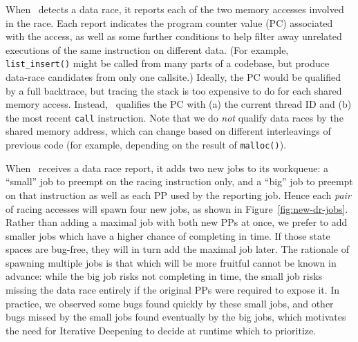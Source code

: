 When \landslide~detects a data race, it reports each of the two memory accesses involved in the race.
Each report indicates the program counter value (PC) associated with the access, as well as some further conditions to help filter away unrelated executions of the same instruction on different data.
(For example, {\tt list\_insert()} might be called from many parts of a codebase, but produce data-race candidates from only one callsite.)
Ideally, the PC would be qualified by a full backtrace, but tracing the stack is too expensive to do for each shared memory access.
Instead, \landslide~qualifies the PC with
(a) the current thread ID and
(b) the most recent {\tt call} instruction.
Note that we do {\em not} qualify data races by the shared memory address,
which can change based on different interleavings of previous code
(for example, depending on the result of {\tt malloc()}).


When \quicksand~receives a data race report, it adds two new jobs to its workqueue:
a ``small'' job to preempt on the racing instruction only,
and a ``big'' job to preempt on that instruction as well as each PP used by the reporting job.
%
Hence each {\em pair} of racing accesses will spawn four new jobs, as shown in Figure~\ref{fig:new-dr-jobs}.
Rather than adding a maximal job with both new PPs at once, we prefer to add smaller jobs which have a higher chance of completing in time.
If those state spaces are bug-free, they will in turn add the maximal job later.
%
The rationale of spawning multiple jobs is that which will be more fruitful cannot be known in advance:
while the big job risks not completing in time,
the small job risks missing the data race entirely if the original PPs were required to expose it.
In practice, we observed some bugs found quickly by these small jobs, and other bugs missed by the small jobs found eventually by the big jobs,
which motivates the need for Iterative Deepening to decide at runtime which to prioritize.



